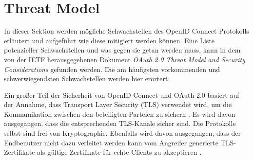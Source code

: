 


\section{Threat Model}

In dieser Sektion werden mögliche Schwachstellen des OpenID Connect Protokolls erläutert und aufgeführt wie diese mitigiert werden können. Eine Liste potenzieller Schwachstellen und was gegen sie getan werden muss, kann in dem von der IETF herausgegebenen Dokument \textit{OAuth 2.0 Threat Model and Security Considerations} \cite{RFC6819} gefunden werden. Die am häufigsten vorkommenden und schwerwiegendsten Schwachstellen werden hier erörtert. \cite{ssoProtocols}

Ein großer Teil der Sicherheit von OpenID Connect und OAuth 2.0 basiert auf der Annahme, dass Transport Layer Security (TLS) verwendet wird, um die Kommunikation zwischen den beteiligten Parteien zu sichern \cite{mladenov2016security}. Es wird davon ausgegangen, dass die entsprechenden TLS-Kanäle sicher sind. Die Protokolle selbst sind frei von Kryptographie. Ebenfalls wird davon ausgegangen, dass der Endbenutzer nicht dazu verleitet werden kann vom Angreifer generierte TLS-Zertifikate als gültige Zertifikate für echte Clients zu akzeptieren \cite{mladenov2016security}.

